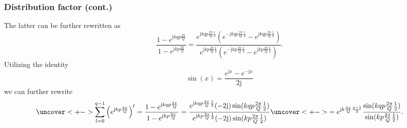 \begin{frame}
	\frametitle{Distribution factor  (cont.)}
    \onslide<+->
    The latter can be further rewritten as
    $$
    \frac{1-e^{\mathrm{j} k q p\frac{2\pi}{Q}}}{1-e^{\mathrm{j} k p\frac{2\pi}{Q}}} = \frac{e^{\mathrm{j} k q p\frac{2\pi}{Q}\frac{1}{2}}\left(e^{-\mathrm{j} k q p\frac{2\pi}{Q}\frac{1}{2}}-e^{\mathrm{j} k q p\frac{2\pi}{Q}\frac{1}{2}}\right)}{e^{\mathrm{j} k p\frac{2\pi}{Q}\frac{1}{2}}\left(e^{-\mathrm{j} k p\frac{2\pi}{Q}\frac{1}{2}}-e^{\mathrm{j} k p\frac{2\pi}{Q}\frac{1}{2}}\right)}.
    $$
    \onslide<+->
    Utilizing the identity
    $$
    \sin(x) = \frac{e^{\mathrm{j} x}-e^{-\mathrm{j} x}}{2\mathrm{j}}
    $$
    \onslide<+->
    we can further rewrite
    \begin{equation}
        \uncover<+->{\sum_{l=0}^{q-1} \left(e^{\mathrm{j} k  p\frac{2\pi}{Q}}\right)^l =\frac{1-e^{\mathrm{j} k q p\frac{2\pi}{Q}}}{1-e^{\mathrm{j} k p\frac{2\pi}{Q}}} = \frac{e^{\mathrm{j} k q p\frac{2\pi}{Q}\frac{1}{2}}(-2\mathrm{j})\sin(k q p\frac{2\pi}{Q}\frac{1}{2})}{e^{\mathrm{j} k p\frac{2\pi}{Q}\frac{1}{2}}(-2\mathrm{j})\sin(k p\frac{2\pi}{Q}\frac{1}{2})}}\uncover<+->{=e^{\mathrm{j}k\frac{2 \pi}{Q}\frac{q-1}{2}}\frac{\sin(k q p\frac{2\pi}{Q}\frac{1}{2})}{\sin(k p\frac{2\pi}{Q}\frac{1}{2})}.}
        \label{eq:sum_exp_distribution_factor_simplified}
    \end{equation}
\end{frame}

